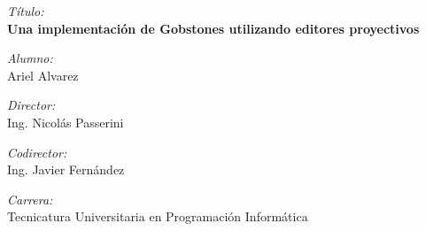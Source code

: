 \Large \emph{Título:}\\
\textbf{Una implementación de Gobstones utilizando editores proyectivos}
\bigskip

\Large \emph{Alumno:}\\
Ariel Alvarez
\bigskip

\Large \emph{Director:}\\
Ing. Nicolás Passerini
\bigskip

\Large \emph{Codirector:}\\
Ing. Javier Fernández
\bigskip


\Large \emph{Carrera:}\\
Tecnicatura Universitaria en Programación Informática
